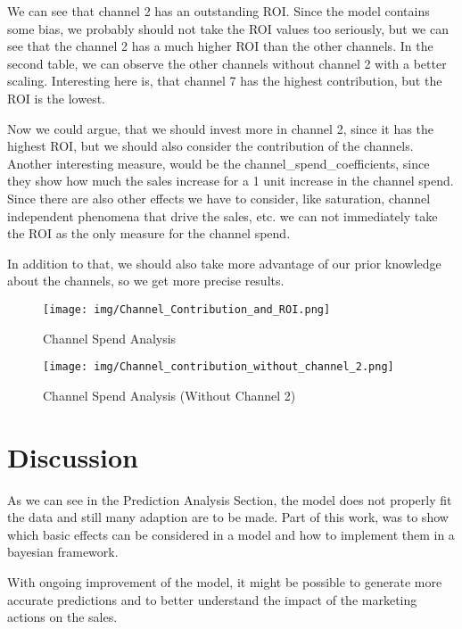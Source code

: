 \documentclass{article}
\begin{document}
We can see that channel 2 has an outstanding ROI. Since the model contains some bias, we probably should not take the ROI values too seriously, 
but we can see that the channel 2 has a much higher ROI than the other channels.
In the second table, we can observe the other channels without channel 2 with a better scaling.
Interesting here is, that channel 7 has the highest contribution, but the ROI is the lowest.

Now we could argue, that we should invest more in channel 2, since it has the highest ROI, but we should also consider the contribution of the channels.
Another interesting measure, would be the channel\_spend\_coefficients, since they show how much the sales increase for a 1 unit increase in the channel spend.
Since there are also other effects we have to consider, like saturation, channel independent phenomena that drive the sales, etc.
we can not immediately take the ROI as the only measure for the channel spend.

In addition to that, we should also take more advantage of our prior knowledge about the channels, so we get more precise results.


\noindent
\begin{figure}[H]
    \centering
    \begin{minipage}[t]{0.48\textwidth}
        \centering
        \texttt{[image: img/Channel\_Contribution\_and\_ROI.png]}
        \caption{Channel Spend Analysis}
        \label{fig:channel_contribution_roi}
    \end{minipage}
    \hfill %
    \begin{minipage}[t]{0.48\textwidth}
        \centering
        \texttt{[image: img/Channel\_contribution\_without\_channel\_2.png]}
        \caption{Channel Spend Analysis (Without Channel 2)}
        \label{fig:channel_contribution_no_channel_2}
    \end{minipage}
\end{figure}



\section{Discussion}
As we can see in the Prediction Analysis Section, the model does not properly fit the data and still many adaption are to be made. 
Part of this work, was to show which basic effects can be considered in a model and how to implement them in a bayesian framework.

With ongoing improvement of the model, it might be possible to generate more accurate predictions and to better understand the impact of the marketing actions on the sales.
\end{document}
